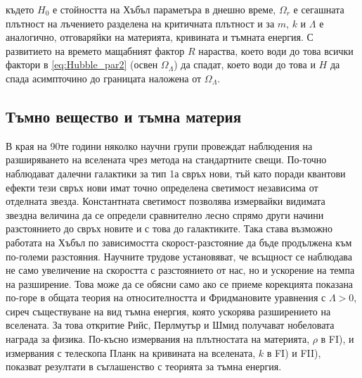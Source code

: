 \documentclass[a4paper,12pt]{article}
\begin{document}
където $H_0$ е стойността на Хъбъл параметъра в днешно време, $\Omega_r$ е сегашната плътност на лъчението разделена на критичната плътност и за $m$, $k$ и $\Lambda$ е аналогично, отговаряйки на материята, кривината и тъмната енергия. С развитието на времето мащабният фактор $R$ нараства, което води до това всички фактори в \eqref{eq:Hubble_par2} (освен $\Omega_\Lambda$) да спадат, което води до това и $H$ да спада асимпточино до границата наложена от $\Omega_\Lambda$.


\subsection{Тъмно вещество и тъмна материя}
В края на 90те години няколко научни групи провеждат наблюдения на разширяването на вселената чрез метода на стандартните свещи. По-точно наблюдават далечни галактики за тип 1а свръх нови, тъй като поради квантови ефекти тези свръх нови имат точно определена светимост независима от отделната звезда. Константната светимост позволява измервайки видимата звездна величина да се определи сравнително лесно спрямо други начини разстоянието до свръх новите и с това до галактиките. Така става възможно работата на Хъбъл по зависимостта скорост-разстояние да бъде продължена към по-големи разстояния. Научните трудове установяват, че всъщност се наблюдава не само увеличение на скоростта с разстоянието от нас, но и ускорение на темпа на разширение. Това може да се обясни само ако се приеме корекцията показана по-горе в общата теория на относителността и Фридмановите уравнения с $\Lambda > 0$, сиреч съществуване на вид тъмна енергия, която ускорява разширението на вселената. За това откритие Рийс, Перлмутър и Шмид получават нобеловата награда за физика. По-късно измервания на плътностата на материята, $\rho$ в FI), и измервания с телескопа Планк на кривината на вселената, $k$ в FI) и FII), показват резултати в съглашенство с теорията за тъмна енергия.\\
\end{document}
